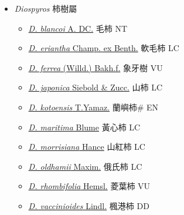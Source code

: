 
  \begin{itemize}
 \item[] \textit{Diospyros} 柿樹屬
                    
  \begin{itemize}
        \item[] \href{http://www.theplantlist.org/tpl1.1/search?q=Diospyros+blancoi}{\textit{D. blancoi} A. DC.}   毛柿 NT
        \item[] \href{http://www.theplantlist.org/tpl1.1/search?q=Diospyros+eriantha}{\textit{D. eriantha} Champ. ex Benth.}   軟毛柿 LC
        \item[] \href{http://www.theplantlist.org/tpl1.1/search?q=Diospyros+ferrea}{\textit{D. ferrea} (Willd.) Bakh.f.}   象牙樹 VU
        \item[] \href{http://www.theplantlist.org/tpl1.1/search?q=Diospyros+japonica}{\textit{D. japonica} Siebold \& Zucc.}   山柿 LC
        \item[] \href{http://www.theplantlist.org/tpl1.1/search?q=Diospyros+kotoensis}{\textit{D. kotoensis} T.Yamaz.}   蘭嶼柿\# EN
        \item[] \href{http://www.theplantlist.org/tpl1.1/search?q=Diospyros+maritima}{\textit{D. maritima} Blume}   黃心柿 LC
        \item[] \href{http://www.theplantlist.org/tpl1.1/search?q=Diospyros+morrisiana}{\textit{D. morrisiana} Hance}   山紅柿 LC
        \item[] \href{http://www.theplantlist.org/tpl1.1/search?q=Diospyros+oldhamii}{\textit{D. oldhamii} Maxim.}   俄氏柿 LC
        \item[] \href{http://www.theplantlist.org/tpl1.1/search?q=Diospyros+rhombifolia}{\textit{D. rhombifolia} Hemsl.}   菱葉柿 VU
        \item[] \href{http://www.theplantlist.org/tpl1.1/search?q=Diospyros+vaccinioides}{\textit{D. vaccinioides} Lindl.}   楓港柿 DD
  \end{itemize}
  \end{itemize}
